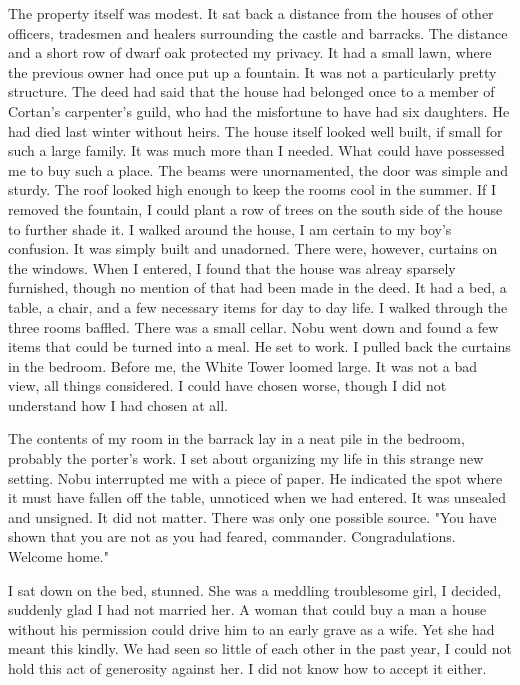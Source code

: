 \documentclass{article}
\begin{document}
The property itself was modest. It sat back a distance from the houses of other officers, tradesmen and healers surrounding the castle and barracks. The distance and a short row of dwarf oak protected my privacy. It had a small lawn, where the previous owner had once put up a fountain. It was not a particularly pretty structure. The deed had said that the house had belonged once to a member of Cortan's carpenter's guild, who had the misfortune to have had six daughters. He had died last winter without heirs. The house itself looked well built, if small for such a large family. It was much more than I needed. What could have possessed me to buy such a place. The beams were unornamented, the door was simple and sturdy. The roof looked high enough to keep the rooms cool in the summer. If I removed the fountain, I could plant a row of trees on the south side of the house to further shade it. I walked around the house, I am certain to my boy's confusion. It was simply built and unadorned. There were, however, curtains on the windows. When I entered, I found that the house was alreay sparsely furnished, though no mention of that had been made in the deed. It had a bed, a table, a chair, and a few necessary items for day to day life. I walked through the three rooms baffled. There was a small cellar. Nobu went down and found a few items that could be turned into a meal. He set to work. I pulled back the curtains in the bedroom. Before me, the White Tower loomed large. It was not a bad view, all things considered. I could have chosen worse, though I did not understand how I had chosen at all. 

The contents of my room in the barrack lay in a neat pile in the bedroom, probably the porter's work. I set about organizing my life in this strange new setting. Nobu interrupted me with a piece of paper. He indicated the spot where it must have fallen off the table, unnoticed when we had entered. It was unsealed and unsigned. It did not matter. There was only one possible source. "You have shown that you are not as you had feared, commander. Congradulations. Welcome home."

I sat down on the bed, stunned. She was a meddling troublesome girl, I decided, suddenly glad I had not married her. A woman that could buy a man a house without his permission could drive him to an early grave as a wife. Yet she had meant this kindly. We had seen so little of each other in the past year, I could not hold this act of generosity against her. I did not know how to accept it either. 
\end{document}
